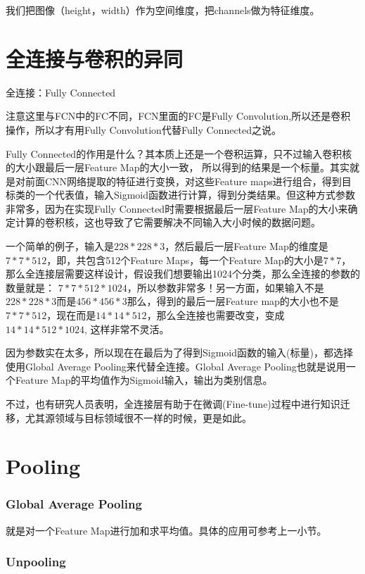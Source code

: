 我们把图像（height，width）作为空间维度，把channels做为特征维度。

\section{全连接与卷积的异同}
全连接：Fully Connected

注意这里与FCN中的FC不同，FCN里面的FC是Fully Convolution,所以还是卷积操作，所以才有用Fully Convolution代替Fully Connected之说。

Fully Connected的作用是什么？其本质上还是一个卷积运算，只不过输入卷积核的大小跟最后一层Feature Map的大小一致， 所以得到的结果是一个标量。其实就是对前面CNN网络提取的特征进行变换，对这些Feature maps进行组合，得到目标类的一个代表值，输入Sigmoid函数进行计算，得到分类结果。但这种方式参数非常多，因为在实现Fully Connected时需要根据最后一层Feature Map的大小来确定计算的卷积核，这也导致了它需要解决不同输入大小时候的数据问题。

一个简单的例子，输入是$228 * 228 * 3$，然后最后一层Feature Map的维度是$7 * 7 * 512$，即，共包含512个Feature Maps，每一个Feature Map的大小是$7 * 7$，那么全连接层需要这样设计，假设我们想要输出1024个分类，那么全连接的参数的数量就是：
$7 * 7 * 512 * 1024$，所以参数非常多！另一方面，如果输入不是$228 * 228 * 3$而是$456 * 456 * 3$那么，得到的最后一层Feature map的大小也不是$7 * 7 * 512$，现在而是$14 * 14 * 512$，那么全连接也需要改变，变成$14 * 14 * 512 * 1024$, 这样非常不灵活。

因为参数实在太多，所以现在在最后为了得到Sigmoid函数的输入(标量)，都选择使用Global Average Pooling来代替全连接。Global Average Pooling也就是说用一个Feature Map的平均值作为Sigmoid输入，输出为类别信息。

不过，也有研究人员表明，全连接层有助于在微调(Fine-tune)过程中进行知识迁移，尤其源领域与目标领域很不一样的时候，更是如此。

\section{Pooling}

\subsubsection{Global Average Pooling}

就是对一个Feature Map进行加和求平均值。具体的应用可参考上一小节。

\subsubsection{Unpooling}

